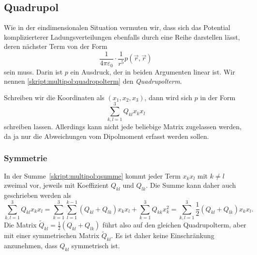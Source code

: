 \subsection{Quadrupol}
%
Wie in der eindimensionalen Situation vermuten wir, dass sich
das Potential komplizierterer Ladungsverteilungen ebenfalls durch
eine Reihe darstellen lässt, deren nächster Term von der Form
\begin{equation}
\frac1{4\pi\varepsilon_0}\cdot\frac{1}{r^5} p(\vec{r},\vec{r})
\label{skript:multipol:quadropolterm}
\end{equation}
sein muss.
Darin ist $p$ ein Ausdruck, der in beiden Argumenten linear ist.
Wir nennen \eqref{skript:multipol:quadropolterm} den {\em Quadrupolterm}.
%

Schreiben wir die Koordinaten als $(x_1,x_2,x_3)$, dann wird 
sich $p$ in der Form
\begin{equation}
\sum_{k,l=1}^3 Q_{kl}x_kx_l
\label{skript:multipol:qsumme}
\end{equation}
schreiben lassen.
Allerdings kann nicht jede beliebige Matrix zugelassen werden, 
da ja nur die Abweichungen vom Dipolmoment erfasst werden sollen.

\subsubsection{Symmetrie}
In der Summe~\eqref{skript:multipol:qsumme} kommt jeder Term
$x_kx_l$ mit $k\ne l$ zweimal vor, jeweils mit Koeffizient $Q_{kl}$
und $Q_{lk}$.
Die Summe kann daher auch geschrieben werden als
\[
\sum_{k,l=1}^3 Q_{kl}x_kx_l
=
\sum_{k=1}^3 \sum_{l=1}^{k-1} (Q_{kl}+Q_{lk})x_kx_l
+
\sum_{k=1}^3 Q_{kk}x_k^2
=
\sum_{k,l=1}^3 \frac12(Q_{kl}+Q_{lk}) x_kx_l.
\]
Die Matrix $\tilde Q_{kl}=\frac12(Q_{kl}+Q_{lk})$ führt also auf den
gleichen Quadrupolterm, aber mit einer symmetrischen Matrix $\tilde Q_{kl}$.
Es ist daher keine Einschränkung anzunehmen, dass $Q_{kl}$ symmetrisch ist.

